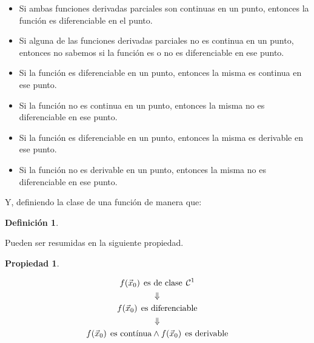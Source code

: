 \documentclass[a5paper,12pt,twoside]{book}
\newtheorem{defn}{{Definición}}[chapter]
\newtheorem{prop}{{Propiedad}}[chapter]
\begin{document}
\begin{itemize}
    \item Si ambas funciones derivadas parciales son continuas en un punto, entonces la función es diferenciable en el punto.
    \item Si alguna de las funciones derivadas parciales no es continua en un punto, entonces no sabemos si la función es o no es diferenciable en ese punto.
    \item Si la función es diferenciable en un punto, entonces la misma es continua en ese punto.
    \item Si la función no es continua en un punto, entonces la misma no es diferenciable en ese punto.
    \item Si la función es diferenciable en un punto, entonces la misma es derivable en ese punto.
    \item Si la función no es derivable en un punto, entonces la misma no es diferenciable en ese punto.
\end{itemize}

Y, definiendo la clase de una función de manera que:
\begin{mdframed}[style=MyFrame1]
    \begin{defn}
    \end{defn}
\end{mdframed}

Pueden ser resumidas en la siguiente propiedad.

\begin{mdframed}[style=MyFrame1]
    \begin{prop}
    \end{prop}
    \begin{gather*}
        f(\Vec{x}_0) \hspace{1ex} \textrm{es de clase} \hspace{1ex} \mathcal{C}^{1}
        \\
        \Downarrow
        \\
        f(\Vec{x}_0) \hspace{1ex} \textrm{es diferenciable}
        \\
        \Downarrow
        \\
        f(\Vec{x}_0) \hspace{1ex} \textrm{es contínua}
        \land
        f(\Vec{x}_0) \hspace{1ex} \textrm{es derivable}
    \end{gather*}
\end{mdframed}
\end{document}
